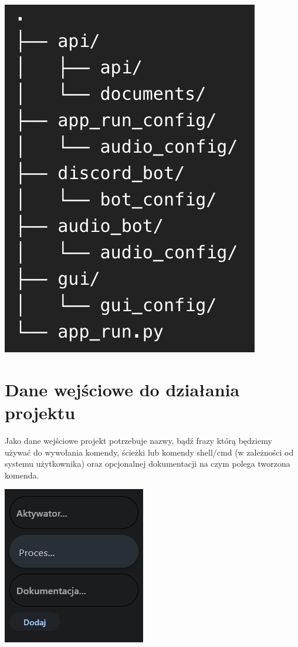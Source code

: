 \documentclass[polish]{article}
\begin{document}
        \begin{center}

          \includegraphics{tree.png}

        \end{center}




    \section{Dane wejściowe do działania projektu}

        Jako dane wejściowe projekt potrzebuje nazwy, bądź frazy którą będziemy używać do wywołania komendy, ścieżki lub komendy shell/cmd (w zależności od systemu użytkownika) oraz opcjonalnej dokumentacji na czym polega tworzona komenda.

        \begin{center}

          \includegraphics[scale=0.6]{screen3.png}

        \end{center}
\end{document}
